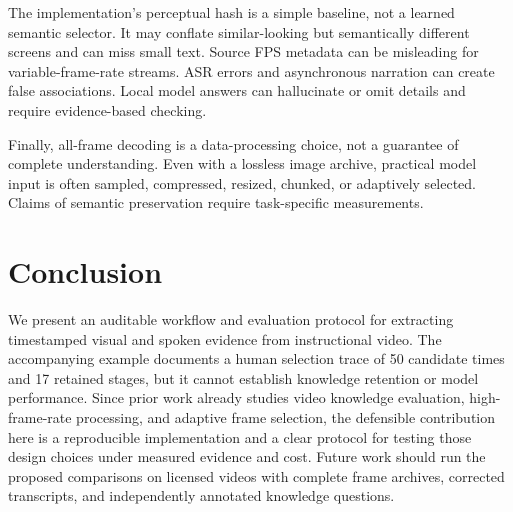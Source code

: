 \documentclass[11pt]{article}
\begin{document}
The implementation's perceptual hash is a simple baseline, not a learned semantic selector. It may conflate similar-looking but semantically different screens and can miss small text. Source FPS metadata can be misleading for variable-frame-rate streams. ASR errors and asynchronous narration can create false associations. Local model answers can hallucinate or omit details and require evidence-based checking.

Finally, all-frame decoding is a data-processing choice, not a guarantee of complete understanding. Even with a lossless image archive, practical model input is often sampled, compressed, resized, chunked, or adaptively selected. Claims of semantic preservation require task-specific measurements.

\section{Conclusion}
We present an auditable workflow and evaluation protocol for extracting timestamped visual and spoken evidence from instructional video. The accompanying example documents a human selection trace of 50 candidate times and 17 retained stages, but it cannot establish knowledge retention or model performance. Since prior work already studies video knowledge evaluation, high-frame-rate processing, and adaptive frame selection, the defensible contribution here is a reproducible implementation and a clear protocol for testing those design choices under measured evidence and cost. Future work should run the proposed comparisons on licensed videos with complete frame archives, corrected transcripts, and independently annotated knowledge questions.
\end{document}
